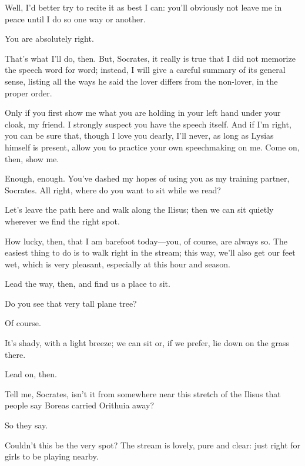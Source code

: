 \sayphaedrus Well, I’d better try to recite it as best I can: you’ll
obviously not leave me in peace until I do so one way or another.

\saysocrates You are absolutely right.

\sayphaedrus That’s what I’ll do, then. But, Socrates, it really is true
that I did not memorize the speech word for word; instead, I
will give a careful summary of its general sense, listing all the ways
he said the lover differs from the non-lover, in the proper order.

\saysocrates Only if you first show me what you are holding in your left
hand under your cloak, my friend. I strongly suspect you have the speech
itself. And if I’m right, you can be sure that, though I love you
dearly, I’ll never, as long as Lysias himself is present, allow you to
practice your own speechmaking on me. Come on, then, show me.

\sayphaedrus Enough, enough. You’ve dashed my hopes of using you as my
training partner, Socrates. All right, where do you want to sit while we
read?

\saysocrates Let’s leave the path here and walk along the Ilisus; then we 
can sit quietly wherever we find the right spot.

\sayphaedrus How lucky, then, that I am barefoot today---you, of course,
are always so. The easiest thing to do is to walk right in the stream;
this way, we’ll also get our feet wet, which is very pleasant,
especially at this hour and season.

\saysocrates Lead the way, then, and find us a place to sit.

\sayphaedrus Do you see that very tall plane tree?

\saysocrates Of course.

\sayphaedrus It’s shady, with a light breeze; we can sit or, if we prefer,
lie down on the grass there.

\saysocrates Lead on, then.

\sayphaedrus Tell me, Socrates, isn’t it from somewhere near this stretch
of the Ilisus that people say Boreas carried Orithuia
away?

\saysocrates So they say.

\sayphaedrus Couldn’t this be the very spot? The stream is lovely, pure and
clear: just right for girls to be playing nearby.

